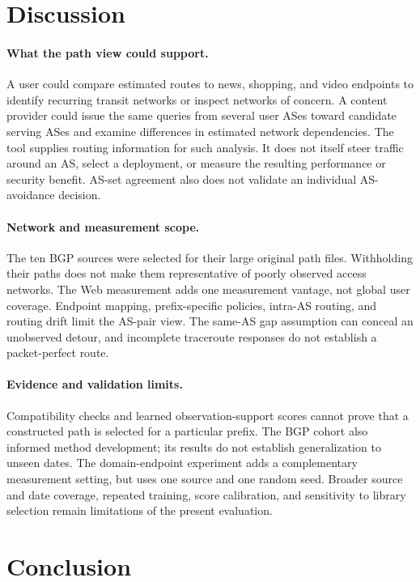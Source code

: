 \documentclass[sigconf,anonymous,review]{acmart}
\begin{document}
\section{Discussion}
\label{sec:discussion}

\paragraph{What the path view could support.}
A user could compare estimated routes to news, shopping, and video endpoints
to identify recurring transit networks or inspect networks of concern.
A content provider could issue the same queries from several user ASes
toward candidate serving ASes and examine differences in estimated network
dependencies. The tool supplies routing information for such analysis.
It does not itself steer traffic around an AS, select a deployment, or
measure the resulting performance or security benefit. AS-set agreement
also does not validate an individual AS-avoidance decision.

\paragraph{Network and measurement scope.}
The ten BGP sources were selected for their large original path files.
Withholding their paths does not make them representative of poorly observed
access networks. The Web measurement adds one measurement vantage, not
global user coverage. Endpoint mapping, prefix-specific policies, intra-AS
routing, and routing drift limit the AS-pair view. The same-AS gap assumption
can conceal an unobserved detour, and incomplete traceroute responses do not
establish a packet-perfect route.

\paragraph{Evidence and validation limits.}
Compatibility checks and learned observation-support scores cannot prove
that a constructed path is selected for a particular prefix. The BGP cohort also informed
method development; its results do not establish generalization to unseen
dates. The domain-endpoint experiment adds a complementary measurement
setting, but uses one source and one random seed. Broader source and date
coverage, repeated training, score calibration, and sensitivity to library
selection remain limitations of the present evaluation.

\section{Conclusion}
\label{sec:conclusion}
\end{document}
